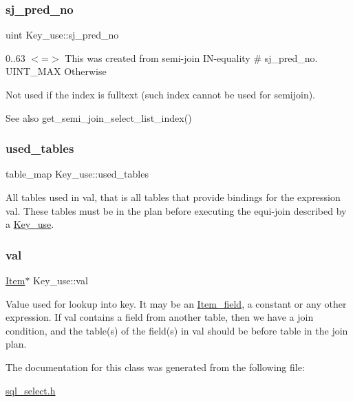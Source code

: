 \subsubsection{\texorpdfstring{sj\+\_\+pred\+\_\+no}{sj\_pred\_no}}
{\footnotesize\ttfamily uint Key\+\_\+use\+::sj\+\_\+pred\+\_\+no}

0..63 $<$=$>$ This was created from semi-\/join IN-\/equality \# sj\+\_\+pred\+\_\+no. U\+I\+N\+T\+\_\+\+M\+AX Otherwise

Not used if the index is fulltext (such index cannot be used for semijoin).

\begin{DoxySeeAlso}{See also}
get\+\_\+semi\+\_\+join\+\_\+select\+\_\+list\+\_\+index() 
\end{DoxySeeAlso}
\mbox{\label{classKey__use_ae721ddf71a4c36bc05cc9110b4bb8165}} 
\subsubsection{\texorpdfstring{used\+\_\+tables}{used\_tables}}
{\footnotesize\ttfamily table\+\_\+map Key\+\_\+use\+::used\+\_\+tables}

All tables used in {\ttfamily val}, that is all tables that provide bindings for the expression {\ttfamily val}. These tables must be in the plan before executing the equi-\/join described by a \mbox{\hyperlink{classKey__use}{Key\+\_\+use}}. \mbox{\label{classKey__use_a152efa6d57e497193957663000d47f59}} 
\subsubsection{\texorpdfstring{val}{val}}
{\footnotesize\ttfamily \mbox{\hyperlink{classItem}{Item}}$\ast$ Key\+\_\+use\+::val}

Value used for lookup into {\ttfamily key}. It may be an \mbox{\hyperlink{classItem__field}{Item\+\_\+field}}, a constant or any other expression. If {\ttfamily val} contains a field from another table, then we have a join condition, and the table(s) of the field(s) in {\ttfamily val} should be before {\ttfamily table} in the join plan. 

The documentation for this class was generated from the following file\+:\begin{DoxyCompactItemize}
\item 
\mbox{\hyperlink{sql__select_8h}{sql\+\_\+select.\+h}}\end{DoxyCompactItemize}
